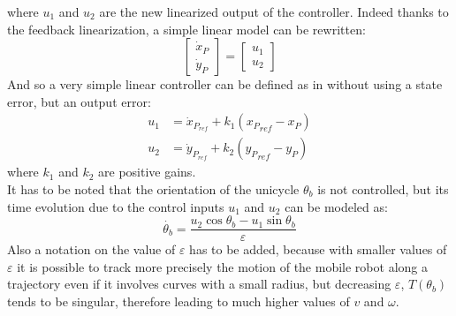 where $u_1$ and $u_2$ are the new linearized output of the controller. Indeed thanks to the feedback linearization, a simple linear model can be rewritten:
\begin{equation}
	\left[\begin{matrix}
		\dot{x}_P\\\dot{y}_P
	\end{matrix}\right]=\left[\begin{matrix}
		u_1\\u_2
	\end{matrix}\right]
\end{equation}
And so a very simple linear controller can be defined as in \cite{siciliano} without using a state error, but an output error:
\begin{equation}
	\begin{split}
		u_1&=\dot{x}_{P_{ref}}+k_1\left({x_P}_{ref}-x_P\right)\\
		u_2&=\dot{y}_{P_{ref}}+k_2\left({y_P}_{ref}-y_P\right)
	\end{split}
\end{equation}
where $k_1$ and $k_2$ are positive gains. \\
It has to be noted that the orientation of the unicycle  $\theta_b$ is not controlled, but its time evolution due to the control inputs $u_1$ and $u_2$ can be modeled as:
\begin{equation}
 	\dot{\theta_b}=\frac{u_2\cos\theta_b-u_1\sin\theta_b}{\varepsilon}
\end{equation}
Also a notation on the value of $\varepsilon$ has to be added, because with smaller values of $\varepsilon$ it is possible to track more precisely the motion of the mobile robot along a trajectory even if it involves curves with a small radius, but decreasing $\varepsilon$, $T(\theta_b)$ tends to be singular, therefore leading to much higher values of $v$ and $\omega$.

